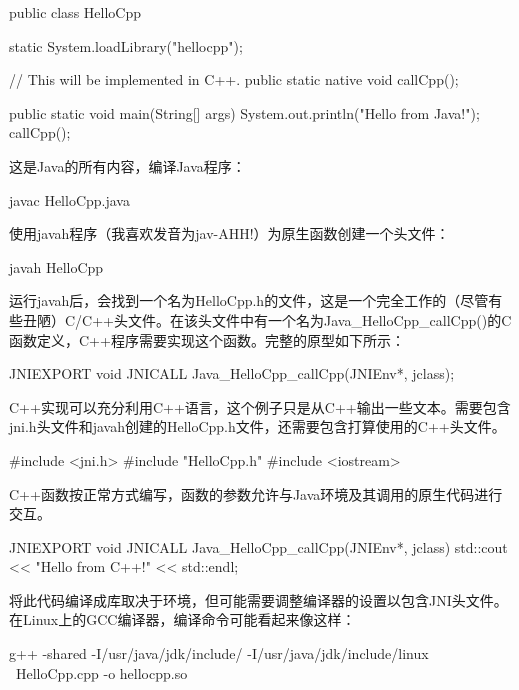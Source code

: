 \begin{cpp}
public class HelloCpp
{
    static { System.loadLibrary("hellocpp"); }

    // This will be implemented in C++.
    public static native void callCpp();

    public static void main(String[] args)
    {
        System.out.println("Hello from Java!");
        callCpp();
    }
}
\end{cpp}

这是Java的所有内容，编译Java程序：

\begin{shell}
javac HelloCpp.java
\end{shell}

使用javah程序（我喜欢发音为jav-AHH!）为原生函数创建一个头文件：

\begin{shell}
javah HelloCpp
\end{shell}

运行javah后，会找到一个名为HelloCpp.h的文件，这是一个完全工作的（尽管有些丑陋）C/C++头文件。在该头文件中有一个名为Java\_HelloCpp\_callCpp()的C函数定义，C++程序需要实现这个函数。完整的原型如下所示：

\begin{cpp}
JNIEXPORT void JNICALL Java_HelloCpp_callCpp(JNIEnv*, jclass);
\end{cpp}

C++实现可以充分利用C++语言，这个例子只是从C++输出一些文本。需要包含jni.h头文件和javah创建的HelloCpp.h文件，还需要包含打算使用的C++头文件。

\begin{cpp}
#include <jni.h>
#include "HelloCpp.h"
#include <iostream>
\end{cpp}

C++函数按正常方式编写，函数的参数允许与Java环境及其调用的原生代码进行交互。

\begin{cpp}
JNIEXPORT void JNICALL Java_HelloCpp_callCpp(JNIEnv*, jclass)
{
    std::cout << "Hello from C++!" << std::endl;
}
\end{cpp}

将此代码编译成库取决于环境，但可能需要调整编译器的设置以包含JNI头文件。在Linux上的GCC编译器，编译命令可能看起来像这样：

\begin{shell}
g++ -shared -I/usr/java/jdk/include/ -I/usr/java/jdk/include/linux \
HelloCpp.cpp -o hellocpp.so
\end{shell}


